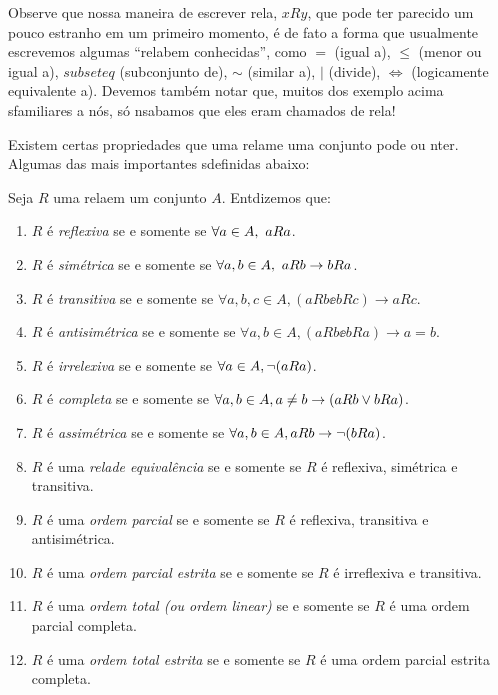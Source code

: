 Observe que nossa maneira de escrever rela\cois, $xRy$, que pode ter parecido um pouco estranho em um primeiro momento, \'e de fato a forma que usualmente escrevemos algumas ``rela\coes bem conhecidas'', como $=$ (igual a), $\leq$ (menor ou igual a), $subseteq$ (subconjunto de), $\sim$ (similar a), $|$ (divide), $\Leftrightarrow$ (logicamente equivalente a). Devemos tamb\'em notar que, muitos dos exemplo acima s\ao familiares a n\'os, s\'o n\ao sab\ih amos que eles eram chamados de rela\cois!

Existem certas propriedades que uma rela\cao me uma conjunto pode ou n\ao ter. Algumas das mais importantes s\ao definidas abaixo:
\begin{definb}\label{reldef1}
Seja $R$ uma rela\cao em um conjunto $A$. Ent\ao dizemos que:
\begin{enumerate}[{\bf a)}]
\item $R$ \'e {\it reflexiva} se e somente se $\forall a\in A,\textrm{ } aRa$.
\item $R$ \'e {\it sim\'etrica} se e somente se $\forall a,b\in A,\textrm{ } aRb\to bRa$.
\item $R$ \'e {\it transitiva} se e somente se $\forall a,b,c\in A, (aRb\ee bRc)\to aRc$.
\item $R$ \'e {\it antisim\'etrica} se e somente se $\forall a,b\in A, (aRb\ee bRa)\to a=b$.
\item $R$ \'e {\it irrelexiva} se e somente se $\forall a\in A, \lnot(aRa)$.
\item $R$ \'e {\it completa} se e somente se $\forall a,b\in A, a\neq b \to (aRb\vee bRa)$.
\item $R$ \'e {\it assim\'etrica} se e somente se $\forall a,b\in A, aRb\to\lnot(bRa)$.
\item $R$ \'e uma {\it rela\cao de equival\^encia} se e somente se $R$ \'e reflexiva, sim\'etrica e transitiva.
\item $R$ \'e uma {\it ordem parcial} se e somente se $R$ \'e reflexiva, transitiva e antisim\'etrica. 
\item $R$ \'e uma {\it ordem parcial estrita} se e somente se $R$ \'e irreflexiva e transitiva.
\item $R$ \'e uma {\it ordem total (ou ordem linear)} se e somente se $R$ \'e uma ordem parcial completa.
\item $R$ \'e uma {\it ordem total estrita } se e somente se $R$ \'e uma ordem parcial estrita completa.
\end{enumerate}
\end{definb}

